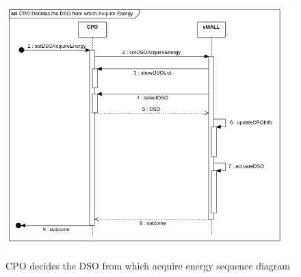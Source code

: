\begin{center}
    \begin{figure} [H]
        \begin{center}
            \includegraphics[width=0.9\linewidth]{Images/SequenceDiagrams/cpo_decides_the_dso_from_which_acquire_energy}
            \caption{CPO decides the DSO from which acquire energy sequence diagram}
            \label{fig: cpo_decides_DSO_seq_diag}
        \end{center}
    \end{figure}
\end{center}

